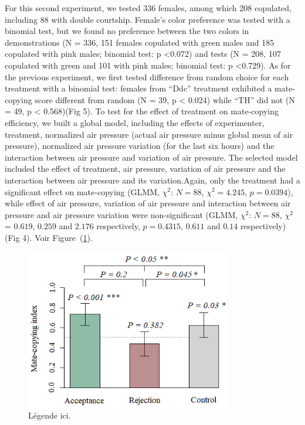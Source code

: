 \documentclass[a4paper, 12pt]{article}
\begin{document}
For this second experiment, we tested 336 females, among which 208 copulated, including 88 with double courtship. Female's color preference was tested with a binomial test, but we found no preference between the two colors in demonstrations (N = 336, 151 females copulated with green males and 185 copulated with pink males; binomial test: p {\textless}0.072) and tests (N = 208, 107 copulated with green and 101 with pink males; binomial test: p {\textless}0.729).
As for the previous experiment, we first tested difference from random choice for each treatment with a binomial test: females from ``Ddc'' treatment exhibited a mate-copying score different from random (N = 39, p {\textless} 0.024) while ``TH'' did not (N = 49, p {\textless} 0.568)(Fig 5).
To test for the effect of treatment on mate-copying efficiency, we built a global model, including the effects of experimenter, treatment, normalized air pressure (actual air pressure minus global mean of air pressure), normalized air pressure variation (for the last six hours) and the interaction between air pressure and variation of air pressure. The selected model included the effect of treatment, air pressure, variation of air pressure and the interaction between air pressure and its variation.Again, only the treatment had a significant effect on mate-copying (GLMM, $\chi^2$: $N = 88$, $\chi^2 = 4.245$, $p = 0.0394$), while effect of air pressure, variation of air pressure and interaction between air pressure and air pressure variation were non-significant (GLMM, $\chi^2$: $N = 88$, $\chi^2$ = $0.619$, $0.259$ and $2.176$ respectively, $p = 0.4315$, $0.611$ and $0.14$ respectively)(Fig 4).
	Voir Figure~(\ref{fig:mcsar}).
		\begin{figure}
		\centering
		\includegraphics[width=0.8\textwidth]{images/mcsar}
		\caption{Légende ici.}
		\label{fig:mcsar}
	\end{figure}
\end{document}
